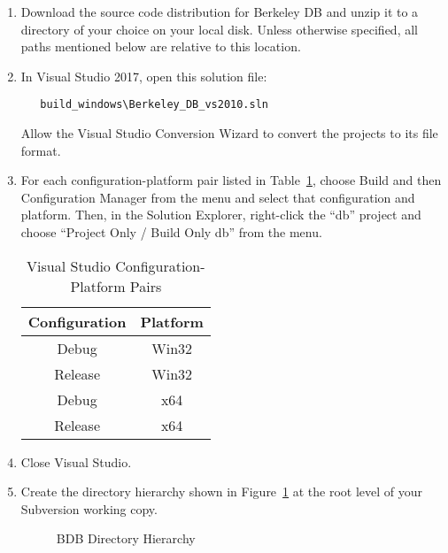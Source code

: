 \begin{enumerate}
\item\label{step-download}Download the source code distribution for Berkeley DB and unzip it to a directory of your choice on your local disk.  Unless otherwise specified, all paths mentioned below are relative to this location.

\item In Visual Studio 2017, open this solution file:
	\begin{verbatim}
   build_windows\Berkeley_DB_vs2010.sln
	\end{verbatim}
Allow the Visual Studio Conversion Wizard to convert the projects to its file format.

\item For each configuration-platform pair listed in Table~\ref{vs-config-platform-pairs}, choose Build and then Configuration Manager from the menu and select that configuration and platform.  Then, in the Solution Explorer, right-click the ``db'' project and choose ``Project Only / Build Only db'' from the menu.

	\begin{table}[htbp]
		\centering
		\begin{tabular}{cc}
			\toprule
			\textbf{Configuration} & \textbf{Platform} \\
			\midrule
			Debug   & Win32 \\
			Release & Win32 \\
			Debug   & x64   \\
			Release & x64   \\
			\bottomrule
		\end{tabular}
		\caption{Visual Studio Configuration-Platform Pairs}
		\label{vs-config-platform-pairs}
	\end{table}

\item Close Visual Studio.

\item\label{step-creates-dirs}Create the directory hierarchy shown in Figure~\ref{fig:bdbDirTree} at the root level of your Subversion working copy.
\begin{figure}[htbp]
	\centering
	\begin{minipage}[t]{3in}
	\end{minipage}
	\caption{BDB Directory Hierarchy}
	\label{fig:bdbDirTree}
\end{figure}


\end{enumerate}

